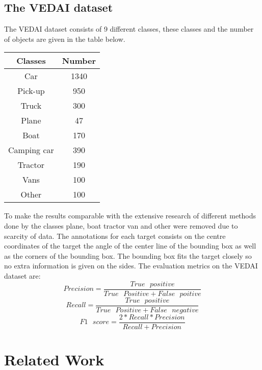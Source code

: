 \documentclass[a4paper,11pt]{article}
\begin{document}
\subsection{The VEDAI dataset}
The VEDAI dataset \cite{razakarivony_vehicle_2015} consists of 9 different classes, these classes and the number of objects are given in the table below.\begin{center}
\begin{tabular}{|c|c|}
\hline
\textbf{Classes} & \textbf{Number}\\
\hline
Car & 1340\\
Pick-up & 950\\
Truck & 300\\
Plane & 47\\
Boat & 170\\
Camping car & 390\\
Tractor & 190\\
Vans & 100\\
Other & 100\\
\hline
\end{tabular}
\end{center}
To make the results comparable with the extensive research of different methods done by \cite{zhong_robust_2017} the classes plane, boat tractor van and other were removed due to scarcity of data. The annotations for each target consists on the centre coordinates of the target the angle of the center line of the bounding box as well as the corners of the bounding box. The bounding box fits the target closely so no extra information is given on the sides. The evaluation metrics on the VEDAI dataset are:\\
\begin{equation}\label{eq:precision}
Precision=\frac{True\textit{ }positive}{True\textit{ }Positive+False\textit{ }poitive}
\end{equation}
\begin{equation}\label{eq:recall}
Recall=\frac{True\textit{ }positive}{True\textit{ }Positive+False\textit{ }negative}
\end{equation}
\begin{equation}\label{eq:f1}
F1\textit{ }score=\frac{2*Recall*Precision}{Recall+Precision}
\end{equation}
\section{Related Work}



\end{document}
